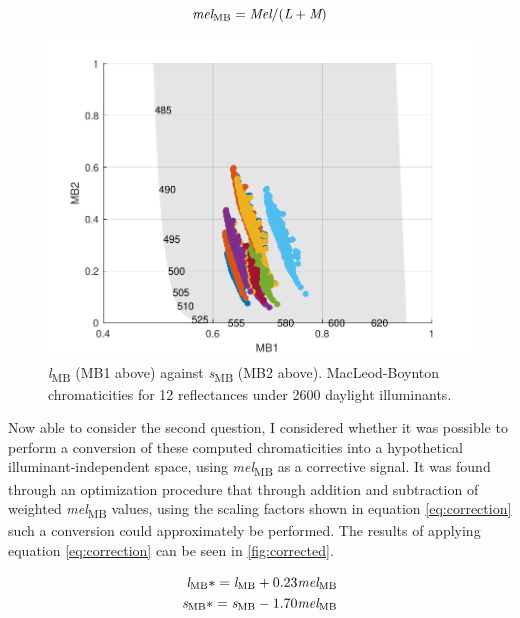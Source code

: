 \documentclass{article}
\begin{document}
\begin{equation} \label{eq:m}
\textit{mel}\textsubscript{MB} = \textit{Mel}/(\textit{L}+\textit{M})
\end{equation}

\begin{figure}[ht]
    \centering
    \includegraphics[width=\textwidth]{figs/mb.pdf}
    \caption{\textit{l}\textsubscript{MB} (MB1 above) against \textit{s}\textsubscript{MB} (MB2 above). MacLeod-Boynton chromaticities for 12 reflectances under 2600 daylight illuminants.}
    \label{fig:mb}
\end{figure} 

Now able to consider the second question, I considered whether it was possible to perform a conversion of these computed chromaticities into a hypothetical illuminant-independent space, using \textit{mel}\textsubscript{MB} as a corrective signal. It was found through an optimization procedure that through addition and subtraction of weighted \textit{mel}\textsubscript{MB} values, using the scaling factors shown in equation \ref{eq:correction} such a conversion could approximately be performed. The results of applying equation \ref{eq:correction} can be seen in \ref{fig:corrected}.

\begin{subequations} \label{eq:correction}
\begin{align}
\textit{l}\textsubscript{MB}* = \textit{l}\textsubscript{MB} + 0.23\textit{mel}\textsubscript{MB}\\
\textit{s}\textsubscript{MB}* = \textit{s}\textsubscript{MB} - 1.70\textit{mel}\textsubscript{MB}
\end{align}
\end{subequations}
\end{document}
